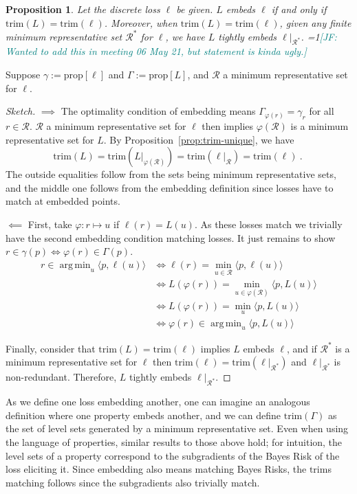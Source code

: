 \documentclass[12pt]{article}
\newcommand{\Comments}{1}
\newcommand{\mynote}[2]{\ifnum\Comments=1\textcolor{#1}{#2}\fi}
\newcommand{\jessie}[1]{\mynote{teal}{[JF: #1]}}
\newcommand{\prop}[1]{\mathrm{prop}[#1]}
\newcommand{\R}{\mathcal{R}}
\newcommand{\inprod}[2]{\langle #1, #2 \rangle}%
\newcommand{\trim}{\mathrm{trim}}
\DeclareMathOperator*{\argmin}{arg\,min}
\newtheorem{proposition}{Proposition}
\begin{document}
\begin{proposition}\label{prop:embed-iff-trims-equal}
  Let the discrete loss $\ell$ be given.
  $L$ embeds $\ell$ if and only if $\trim(L) = \trim(\ell)$.
  Moreover, when $\trim(L) = \trim(\ell)$, given any finite minimum representative set $\R^*$ for $\ell$, we have $L$ tightly embeds $\ell|_{\R^*}$. \jessie{Wanted to add this in meeting 06 May 21, but statement is kinda ugly.}
\end{proposition}
Suppose $\gamma := \prop{\ell}$ and $\Gamma := \prop{L}$, and $\R$ a minimum representative set for $\ell$.
\begin{proof}[Sketch]
  $\implies$
  The optimality condition of embedding means $\Gamma_{\varphi(r)} = \gamma_r$ for all $r \in \R$.
  $\R$ a minimum representative set for $\ell$ then implies $\varphi(\R)$ is a minimum representative set for $L$.
  By Proposition~\ref{prop:trim-unique}, we have
  \begin{equation*}
    \trim(L) = \trim(L|_{\varphi(\R)}) = \trim(\ell|_\R) = \trim(\ell)~.~
  \end{equation*}
  The outside equalities follow from the sets being minimum representative sets, and the middle one follows from the embedding definition since losses have to match at embedded points.
  
  $\impliedby$
  First, take $\varphi: r \mapsto u$ if $\ell(r) = L(u)$.
  As these losses match we trivially have the second embedding condition matching losses.
  It just remains to show $r \in \gamma(p) \iff \varphi(r) \in \Gamma(p)$.
  \begin{align*}
    r \in \argmin_u \inprod{p}{\ell(u)} &\iff \ell(r) = \min_{u \in \R} \inprod{p}{\ell(u)} \\
                                        &\iff L(\varphi(r)) = \min_{u \in \varphi(\R)} \inprod{p}{L(u)} \\
                                        &\iff L(\varphi(r)) = \min_u \inprod{p}{L(u)} \\
                                        &\iff \varphi(r) \in \argmin_{u} \inprod{p}{L(u)}
  \end{align*}
  
  Finally, consider that $\trim(L) = \trim(\ell)$ implies $L$ embeds $\ell$, and if $\R^*$ is a minimum representative set for $\ell$ then $\trim(\ell) = \trim(\ell|_{\R^*})$ and $\ell|_{\R^*}$ is non-redundant.
  Therefore, $L$ tightly embeds $\ell|_{\R^*}$.
\end{proof}

As we define one loss embedding another, one can imagine an analogous definition where one property embeds another, and we can define $\trim(\Gamma)$ as the set of level sets generated by a minimum representative set.
Even when using the language of properties, similar results to those above hold; for intuition, the level sets of a property correspond to the subgradients of the Bayes Risk of the loss eliciting it.
Since embedding also means matching Bayes Risks, the $\trim$s matching follows since the subgradients also trivially match.
\end{document}
